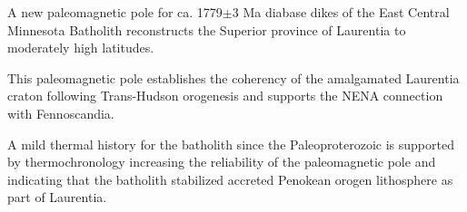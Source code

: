 \documentclass[draft]{agujournal2019}
\begin{document}







\begin{keypoints}
\item A new paleomagnetic pole for ca. 1779$\pm$3 Ma diabase dikes of the East Central Minnesota Batholith reconstructs the Superior province of Laurentia to moderately high latitudes.
\item This paleomagnetic pole establishes the coherency of the amalgamated Laurentia craton following Trans-Hudson orogenesis and supports the NENA connection with Fennoscandia.
\item A mild thermal history for the batholith since the Paleoproterozoic is supported by thermochronology increasing the reliability of the paleomagnetic pole and indicating that the batholith stabilized accreted Penokean orogen lithosphere as part of Laurentia.
\end{keypoints}

%
%
\end{document}
